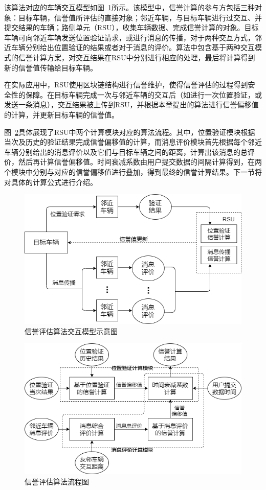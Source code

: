 该算法对应的车辆交互模型如图~\ref{fig:model}所示。该模型中，信誉计算的参与方包括三种对象：目标车辆，信誉值所评估的直接对象；邻近车辆，与目标车辆进行过交互、并提交结果的车辆；路侧单元（RSU），收集车辆数据、完成信誉计算的对象。目标车辆可向邻近车辆发送位置验证请求，或进行消息的传播，对于两种交互方式，邻近车辆分别给出位置验证的结果或者对于消息的评价。算法中包含基于两种交互模式的信誉计算方案，对交互结果在RSU中分别进行相应的处理，最后将计算得到新的信誉值传输给目标车辆。

在实际应用中，RSU使用区块链结构进行信誉维护，使得信誉评估的过程得到安全性的保障。在目标车辆完成一次与邻近车辆的交互后（如进行一次位置验证，或发送一条消息），交互结果被上传到RSU，并根据本章提出的算法进行信誉偏移值的计算，并更新目标车辆的信誉值。

图~\ref{fig:algo}具体展现了RSU中两个计算模块对应的算法流程。其中，位置验证模块根据当次及历史的验证结果完成信誉偏移值的计算，而消息评价模块首先根据每个邻近车辆分别给出的消息评价以及它们与目标车辆之间的距离，计算出该消息的总评价，然后再计算信誉偏移值。时间衰减系数由用户提交数据的间隔计算得到，在两个模块中分别与对应的信誉偏移值进行叠加，得到最终的信誉计算结果。下一节将对具体的计算公式进行介绍。

\begin{figure}
  \centering
  \includegraphics[width=0.8\linewidth]{figures/model.png}
  \caption{信誉评估算法交互模型示意图}
  \label{fig:model}
\end{figure}

\begin{figure}
  \centering
  \includegraphics[width=0.8\linewidth]{figures/algo.png}
  \caption{信誉评估算法流程图}
  \label{fig:algo}
\end{figure}


